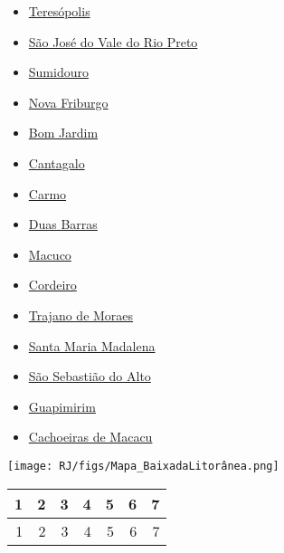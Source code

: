 \documentclass[10pt]{article} %
\begin{document}
\begin{minipage}[t]{.30\linewidth}
\begin{mdframed}[style=sidebar,frametitle={}]
\begin{itemize}
\item \hyperlink{https:/alerta.dengue.mat.br/alerta/3305802}{Teresópolis}
\item \hyperlink{https:/alerta.dengue.mat.br/alerta/3305158}{São José do Vale do Rio Preto}
\item \hyperlink{https:/alerta.dengue.mat.br/alerta/3305703}{Sumidouro}
\item \hyperlink{https:/alerta.dengue.mat.br/alerta/3303401}{Nova Friburgo}
\item \hyperlink{https:/alerta.dengue.mat.br/alerta/3300506}{Bom Jardim}
\item \hyperlink{https:/alerta.dengue.mat.br/alerta/3301108}{Cantagalo}
\item \hyperlink{https:/alerta.dengue.mat.br/alerta/3301207}{Carmo}
\item \hyperlink{https:/alerta.dengue.mat.br/alerta/3301603}{Duas Barras}
\item \hyperlink{https:/alerta.dengue.mat.br/alerta/3302452}{Macuco}
\item \hyperlink{https:/alerta.dengue.mat.br/alerta/3301504}{Cordeiro}
\item \hyperlink{https:/alerta.dengue.mat.br/alerta/3305901}{Trajano de Moraes}
\item \hyperlink{https:/alerta.dengue.mat.br/alerta/3304607}{Santa Maria Madalena}
\item \hyperlink{https:/alerta.dengue.mat.br/alerta/3305307}{São Sebastião do Alto}
\item \hyperlink{https:/alerta.dengue.mat.br/alerta/3301850}{Guapimirim}
\item \hyperlink{https:/alerta.dengue.mat.br/alerta/3300803}{Cachoeiras de Macacu}
\end{itemize}\end{mdframed}\hfill\end{minipage}\newpage\begin{minipage}[t]{.66\linewidth}
\hypertarget{ BLâ }{}
\texttt{[image: RJ/figs/Mapa\_BaixadaLitorânea.png]}\vspace{0.5cm}\begin{center}
\begin{tabular}{rrrrrrr}
  \hline
1 & 2 & 3 & 4 & 5 & 6 & 7 \\ 
  \hline
  1 &   2 &   3 &   4 &   5 &   6 &   7 \\ 

\end{tabular}
\end{center}
\end{minipage}
\end{document}
